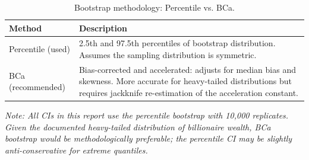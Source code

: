 \begin{table}[H]
\centering
\caption{Bootstrap methodology: Percentile vs. BCa.}
\label{tab:bootstrap}
\begin{tabular}{lp{6cm}}
\toprule
Method & Description \\
\midrule
Percentile (used) & 2.5th and 97.5th percentiles of bootstrap distribution. Assumes the sampling distribution is symmetric. \\
BCa (recommended) & Bias-corrected and accelerated: adjusts for median bias and skewness. More accurate for heavy-tailed distributions but requires jackknife re-estimation of the acceleration constant. \\
\bottomrule
\end{tabular}
\bigskip
\textit{Note: All CIs in this report use the percentile bootstrap with 10{,}000 replicates. Given the documented heavy-tailed distribution of billionaire wealth, BCa bootstrap would be methodologically preferable; the percentile CI may be slightly anti-conservative for extreme quantiles.}
\end{table}
